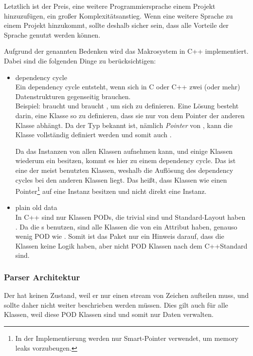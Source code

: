       Letztlich ist der Preis, eine weitere Programmiersprache einem Projekt hinzuzufügen, ein großer Komplexitätsanstieg. Wenn eine weitere Sprache zu einem Projekt hinzukommt, sollte deshalb sicher sein, dass alle Vorteile der Sprache genutzt werden können.


      Aufgrund der genannten Bedenken wird das Makrosystem in C++ implementiert. Dabei sind die folgenden Dinge zu berücksichtigen:
      \begin{itemize}
        \item dependency cycle\\
          Ein dependency cycle entsteht, wenn sich in C oder C++ zwei (oder mehr) Datenstrukturen gegenseitig brauchen.\\
          Beispiel:  braucht  und  braucht , um sich zu definieren. Eine Lösung besteht darin, eine Klasse so zu definieren, dass sie nur von dem Pointer der anderen Klasse abhängt. Da der Typ bekannt ist, nämlich \emph{Pointer} von , kann die Klasse  vollständig definiert werden und somit auch .

          Da das  Instanzen von allen  Klassen aufnehmen kann, und einige Klassen wiederum ein  besitzen, kommt es hier zu einem dependency cycle. Das  ist eine der meist benutzten Klassen, weshalb die Auflösung des dependency cycles bei den anderen Klassen liegt. Das heißt, dass Klassen wie  einen Pointer\footnote{
            In der Implementierung werden nur Smart-Pointer verwendet, um memory leaks vorzubeugen.
          } auf eine  Instanz besitzen und nicht direkt eine  Instanz.
        \item plain old data\\
          In C++ sind nur Klassen PODs, die trivial sind und Standard-Layout haben \autocite[9 Classes §10]{C++14-std}. Da die s  benutzen, sind alle Klassen die von  ein Attribut haben, genauso wenig POD wie . Somit ist das  Paket nur ein Hinweis darauf, dass die Klassen keine Logik haben, aber nicht POD Klassen nach dem C++Standard sind.
      \end{itemize}

    \subsubsection{Parser Architektur}
    \label{sssec:Parser Architektur}
      Der  hat keinen Zustand, weil er nur einen stream von Zeichen aufteilen muss, und sollte daher nicht weiter beschrieben werden müssen. Dies gilt auch für alle  Klassen, weil diese POD Klassen sind und somit nur Daten verwalten.

